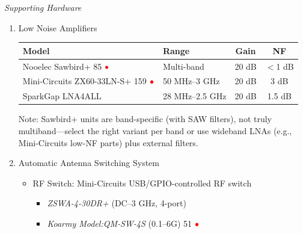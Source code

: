 \documentclass[11pt]{report}
\newcommand{\gc}[1]{\textcolor[rgb]{1.00,0.00,0.00}{#1}}
\newcommand{\blue}[1]{\textcolor[rgb]{0.00,0.00,1.00}{#1}}
\begin{document}
\begin{description}
\newpage
\textit{Supporting Hardware}

\begin{enumerate}[label=\roman*)]
\item {Low Noise Amplifiers}
\begin{table}[!h]
	\centering
	\small
	\begin{tabular}{llcc}
		\toprule
		\textbf{Model} & \textbf{Range} & \textbf{Gain} & \textbf{NF} \\ 
		\midrule
		Nooelec Sawbird+ \blue{85} \href{https://www.amazon.com/Nooelec-SAWbird-ADS-B-Dual-Channel-Applications/dp/B0CBD1KK3G?currency=USD}{$\gc{\bullet}$} & Multi-band 
		 & 20 dB & $<$1 dB \\
		Mini-Circuits ZX60-33LN-S+ \blue{159} \href{https://www.ebay.com/itm/136591156802?chn=ps&norover=1&mkevt=1&mkrid=711-166974-028196-7&mkcid=2&mkscid=101&itemid=136591156802&targetid=2276391439863&device=c&mktype=pla&googleloc=1003657&poi=&campaignid=22194955902&mkgroupid=173231690126&rlsatarget=pla-2276391439863&abcId=10184702&merchantid=115295959&geoid=1003657&gad_source=1&gad_campaignid=22194955902&gbraid=0AAAAAD_QDh-jI1T7Dge_UgSU-AxGFOmmq&gclid=Cj0KCQiAp-zLBhDkARIsABcYc6sV5abrOZlhL86dpnsH4B8dZwWfIbScQwfwtbQ26qnvBkwP1BF0IN8aAs-fEALw_wcB}{$\gc{\bullet}$}& 50 MHz--3 GHz & 20 dB & 3 dB \\
		SparkGap LNA4ALL & 28 MHz--2.5 GHz & 20 dB & 1.5 dB \\
		\bottomrule
	\end{tabular}
\end{table}

Note: Sawbird+ units are band-specific (with SAW filters), not truly multiband—select the right variant per band or use wideband LNAs (e.g., Mini-Circuits low-NF parts) plus external filters.
\item{Automatic Antenna Switching System}
\begin{itemize}
	\item{RF Switch:} Mini-Circuits USB/GPIO-controlled RF switch
	\begin{itemize}
		\item \textit{ZSWA-4-30DR+} (DC--3 GHz, 4-port) 
		\item \textit{Koarmy Model:QM-SW-4S} (0.1--6G) \blue{51} \href{https://www.amazon.ca/Koarmy-0-1-6GHz-Isolation-Microwave-Electronic/dp/B0DKHDK58P}{$\gc{\bullet}$}
	\end{itemize}
	

\end{itemize}
\end{enumerate}
\end{description}
\end{document}
